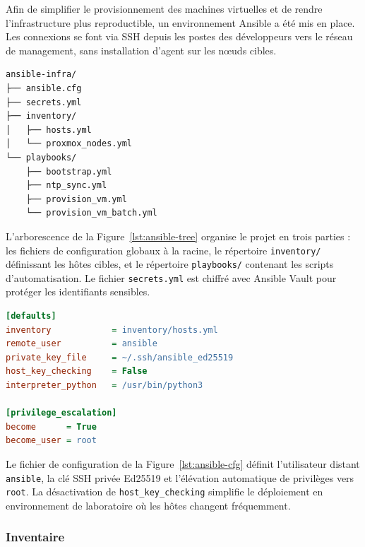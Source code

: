 \par Afin de simplifier le provisionnement des machines virtuelles et de rendre l'infrastructure plus reproductible, un
environnement Ansible a été mis en place. Les connexions se font via SSH depuis les postes des développeurs vers le réseau de
management, sans installation d'agent sur les nœuds cibles.\\

\begin{lstlisting}[style=sonacode,language={},caption={Structure du projet Ansible},label={lst:ansible-tree}]
ansible-infra/
├── ansible.cfg
├── secrets.yml
├── inventory/
│   ├── hosts.yml
│   └── proxmox_nodes.yml
└── playbooks/
    ├── bootstrap.yml
    ├── ntp_sync.yml
    ├── provision_vm.yml
    └── provision_vm_batch.yml
\end{lstlisting}

\par L'arborescence de la Figure~\ref{lst:ansible-tree} organise le projet en trois parties : les fichiers de configuration globaux à la racine, le répertoire
\texttt{inventory/} définissant les hôtes cibles, et le répertoire \texttt{playbooks/} contenant les scripts d'automatisation. Le
fichier \texttt{secrets.yml} est chiffré avec Ansible Vault pour protéger les identifiants sensibles.\\

\begin{lstlisting}[style=sonacode,language=ini,caption={Fichier ansible.cfg},label={lst:ansible-cfg}]
[defaults]
inventory            = inventory/hosts.yml
remote_user          = ansible
private_key_file     = ~/.ssh/ansible_ed25519
host_key_checking    = False
interpreter_python   = /usr/bin/python3

[privilege_escalation]
become      = True
become_user = root
\end{lstlisting}

\par Le fichier de configuration de la Figure~\ref{lst:ansible-cfg} définit l'utilisateur distant \texttt{ansible}, la clé SSH privée Ed25519 et l'élévation automatique de privilèges
vers \texttt{root}. La désactivation de \texttt{host\_key\_checking} simplifie le déploiement en environnement de laboratoire où
les hôtes changent fréquemment.\\

\subsubsection{Inventaire}

